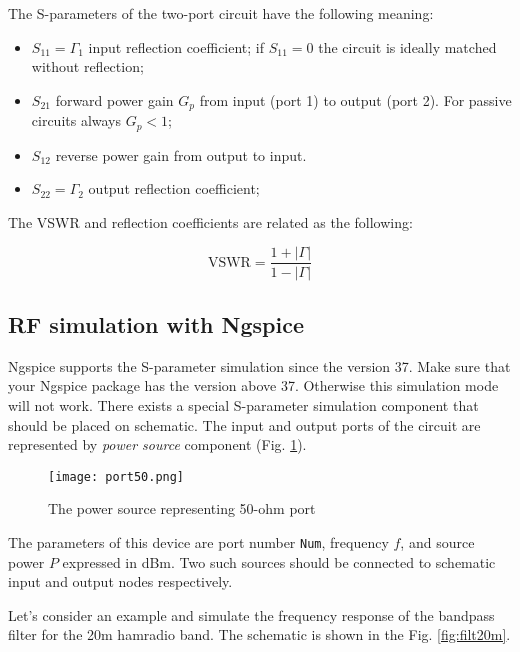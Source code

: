 The S-parameters of the two-port circuit have the following meaning:

\begin{itemize}
 \item $S_{11}=\Gamma_1$ input reflection coefficient; if $S_{11}=0$ the circuit is ideally matched without reflection;
 \item $S_{21}$ forward power gain $G_p$ from input (port 1) to output (port 2). For passive circuits always $G_p<1$;
 \item $S_{12}$ reverse power gain from output to input.
 \item $S_{22}=\Gamma_2$ output reflection coefficient;
\end{itemize}

The VSWR and reflection coefficients are related as the following:

\begin{equation}
 \mathrm{VSWR} = \frac{1+|\Gamma|}{1-|\Gamma|}
\end{equation}

\subsection{RF simulation with Ngspice}

Ngspice supports the S-parameter simulation since the version 37. Make sure that your Ngspice package has the version above 37. Otherwise this simulation mode will not work. There exists a special S-parameter simulation component that should be placed on schematic. The input and output ports of the circuit are represented by \emph{power source} component (Fig. \ref{fig:port50}).

    \begin{figure}[!ht]
    \begin{center}
        \texttt{[image: port50.png]}
    \end{center}
    \caption{The power source representing 50-ohm port} \label{fig:port50}
    \end{figure}

The parameters of this device are port number \verb|Num|, frequency $f$, and source power $P$ expressed in dBm. Two such sources should be connected to schematic input and output nodes respectively.

Let's consider an example and simulate the frequency response of the bandpass filter for the 20m hamradio band. The schematic is shown in the Fig. \ref{fig:filt20m}.

